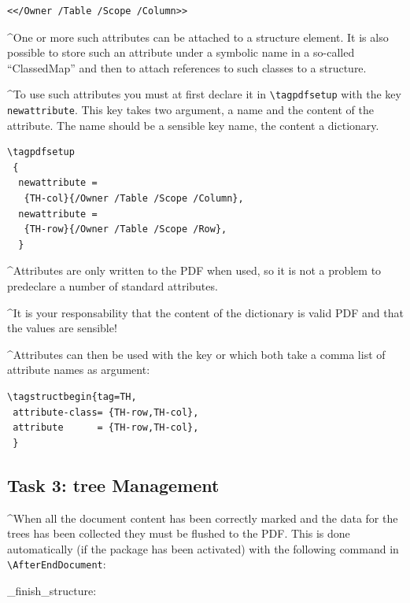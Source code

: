 \documentclass[DIV=12,parskip=half-,bibliography=totoc]{scrartcl}
\newcommand\PDF{PDF}
\begin{document}
\begin{lstlisting}
<</Owner /Table /Scope /Column>>
\end{lstlisting}

\TagP^One or more such attributes can be attached to a structure element. It is also possible to store such an attribute under a symbolic name in a so-called \enquote{ClassedMap} and then to attach references to such classes to a structure.\TagPend

\TagP^To use such attributes you must at first declare it in \verb+\tagpdfsetup+ with the key \texttt{newattribute}. This key takes two argument, a name and the content of the attribute.
The name should be a sensible key name, the content a dictionary.
\TagPend


\begin{lstlisting}
\tagpdfsetup
 {
  newattribute =
   {TH-col}{/Owner /Table /Scope /Column},
  newattribute =
   {TH-row}{/Owner /Table /Scope /Row},
  }
\end{lstlisting}



\TagP^Attributes are only written to the \PDF{} when used, so it is not a problem to predeclare a number of standard attributes.
\TagPend

\TagP^It is your responsability that the content of the dictionary is valid \PDF{} and that the values are sensible!
\TagPend

\TagP^Attributes can then be used with the key  or  which both take a comma list of attribute names as argument:
\TagPend


\begin{lstlisting}
\tagstructbegin{tag=TH,
 attribute-class= {TH-row,TH-col},
 attribute      = {TH-row,TH-col},
 }
\end{lstlisting}



\subsection{Task 3: tree Management}
\TagP^When all the document content has been correctly marked and the data for the trees has been collected they must be flushed to the \PDF{}. This is done automatically (if the package has been activated) with the following command in \verb+\AfterEndDocument+:\TagPend

\ExplSyntaxOn
\DescribeMacro\tag_finish_structure:
\ExplSyntaxOff
\end{document}
